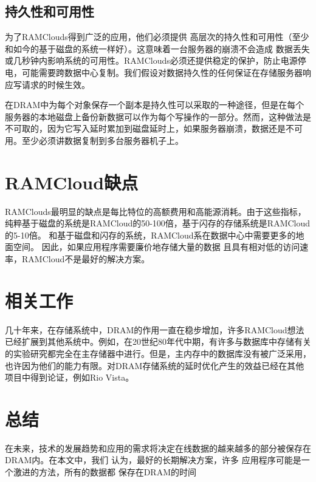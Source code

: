 \documentclass[translation]{zjutreport}
\begin{document}
\section{持久性和可用性}
为了RAMClouds得到广泛的应用，他们必须提供
高层次的持久性和可用性（至少和如今的基于磁盘的系统一样好）。这意味着一台服务器的崩溃不会造成
数据丢失或几秒钟内影响系统的可用性。RAMClouds必须还提供稳定的保护，防止电源停电，可能需要跨数据中心复制。我们假设对数据持久性的任何保证在存储服务器响应写请求的时候生效。

在DRAM中为每个对象保存一个副本是持久性可以采取的一种途径，但是在每个服务器的本地磁盘上备份新数据可以作为每个写操作的一部分。然而，这种做法是不可取的，因为它写入延时累加到磁盘延时上，如果服务器崩溃，数据还是不可用。至少必须讲数据复制到多台服务器机子上。

\chapter{RAMCloud缺点}
RAMClouds最明显的缺点是每比特位的高额费用和高能源消耗。由于这些指标，纯粹基于磁盘的系统是RAMCloud的50-100倍，基于闪存的存储系统是RAMCloud的5-10倍。
和基于磁盘和闪存的系统，RAMCloud系在数据中心中需要更多的地面空间。
因此，如果应用程序需要廉价地存储大量的数据
且具有相对低的访问速率，RAMCloud不是最好的解决方案。

\chapter{相关工作}
几十年来，在存储系统中，DRAM的作用一直在稳步增加，许多RAMCloud想法已经扩展到其他系统中。例如，在20世纪80年代中期，有许多与数据库中存储有关的实验研究都完全在主存储器中进行。但是，主内存中的数据库没有被广泛采用，也许因为他们的能力有限。对DRAM存储系统的延时优化产生的效益已经在其他项目中得到论证，例如Rio Vista。

\chapter{总结}
在未来，技术的发展趋势和应用的需求将决定在线数据的越来越多的部分被保存在DRAM内。在本文中，我们
认为，最好的长期​​解决方案，许多
应用程序可能是一个激进的方法，所有的数据都
保存在DRAM的时间

\backmatter %
\endgroup %

\clearpage %

\nocite{*}                                   %


\end{document}
